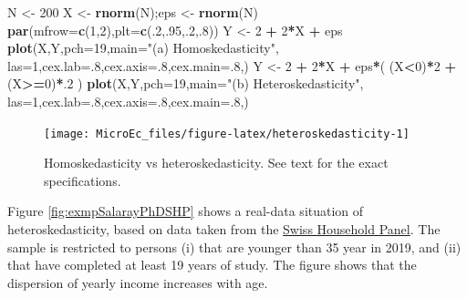\documentclass[
  12pt,
]{book}
\newenvironment{Shaded}{\begin{snugshade}}{\end{snugshade}}
\newcommand{\AttributeTok}[1]{\textcolor[rgb]{0.13,0.29,0.53}{#1}}
\newcommand{\DecValTok}[1]{\textcolor[rgb]{0.00,0.00,0.81}{#1}}
\newcommand{\FunctionTok}[1]{\textcolor[rgb]{0.13,0.29,0.53}{\textbf{#1}}}
\newcommand{\NormalTok}[1]{#1}
\newcommand{\OtherTok}[1]{\textcolor[rgb]{0.56,0.35,0.01}{#1}}
\newcommand{\SpecialCharTok}[1]{\textcolor[rgb]{0.81,0.36,0.00}{\textbf{#1}}}
\newcommand{\StringTok}[1]{\textcolor[rgb]{0.31,0.60,0.02}{#1}}
\theoremstyle{definition}
\theoremstyle{definition}
\theoremstyle{definition}
\theoremstyle{definition}
\theoremstyle{remark}
\begin{document}
\begin{Shaded}
\begin{Highlighting}[]
\NormalTok{N }\OtherTok{\textless{}{-}} \DecValTok{200}
\NormalTok{X }\OtherTok{\textless{}{-}} \FunctionTok{rnorm}\NormalTok{(N);eps }\OtherTok{\textless{}{-}} \FunctionTok{rnorm}\NormalTok{(N)}
\FunctionTok{par}\NormalTok{(}\AttributeTok{mfrow=}\FunctionTok{c}\NormalTok{(}\DecValTok{1}\NormalTok{,}\DecValTok{2}\NormalTok{),}\AttributeTok{plt=}\FunctionTok{c}\NormalTok{(.}\DecValTok{2}\NormalTok{,.}\DecValTok{95}\NormalTok{,.}\DecValTok{2}\NormalTok{,.}\DecValTok{8}\NormalTok{))}
\NormalTok{Y }\OtherTok{\textless{}{-}} \DecValTok{2} \SpecialCharTok{+} \DecValTok{2}\SpecialCharTok{*}\NormalTok{X }\SpecialCharTok{+}\NormalTok{ eps}
\FunctionTok{plot}\NormalTok{(X,Y,}\AttributeTok{pch=}\DecValTok{19}\NormalTok{,}\AttributeTok{main=}\StringTok{"(a) Homoskedasticity"}\NormalTok{,}
     \AttributeTok{las=}\DecValTok{1}\NormalTok{,}\AttributeTok{cex.lab=}\NormalTok{.}\DecValTok{8}\NormalTok{,}\AttributeTok{cex.axis=}\NormalTok{.}\DecValTok{8}\NormalTok{,}\AttributeTok{cex.main=}\NormalTok{.}\DecValTok{8}\NormalTok{,)}
\NormalTok{Y }\OtherTok{\textless{}{-}} \DecValTok{2} \SpecialCharTok{+} \DecValTok{2}\SpecialCharTok{*}\NormalTok{X }\SpecialCharTok{+}\NormalTok{ eps}\SpecialCharTok{*}\NormalTok{( (X}\SpecialCharTok{\textless{}}\DecValTok{0}\NormalTok{)}\SpecialCharTok{*}\DecValTok{2} \SpecialCharTok{+}\NormalTok{ (X}\SpecialCharTok{\textgreater{}=}\DecValTok{0}\NormalTok{)}\SpecialCharTok{*}\NormalTok{.}\DecValTok{2}\NormalTok{ )}
\FunctionTok{plot}\NormalTok{(X,Y,}\AttributeTok{pch=}\DecValTok{19}\NormalTok{,}\AttributeTok{main=}\StringTok{"(b) Heteroskedasticity"}\NormalTok{,}
     \AttributeTok{las=}\DecValTok{1}\NormalTok{,}\AttributeTok{cex.lab=}\NormalTok{.}\DecValTok{8}\NormalTok{,}\AttributeTok{cex.axis=}\NormalTok{.}\DecValTok{8}\NormalTok{,}\AttributeTok{cex.main=}\NormalTok{.}\DecValTok{8}\NormalTok{,)}
\end{Highlighting}
\end{Shaded}

\begin{figure}
\texttt{[image: MicroEc\_files/figure-latex/heteroskedasticity-1]} \caption{Homoskedasticity vs heteroskedasticity. See text for the exact specifications.}\label{fig:heteroskedasticity}
\end{figure}

Figure \ref{fig:exmpSalarayPhDSHP} shows a real-data situation of heteroskedasticity, based on data taken from the \href{https://forscenter.ch/projects/swiss-household-panel/}{Swiss Household Panel}. The sample is restricted to persons (i) that are younger than 35 year in 2019, and (ii) that have completed at least 19 years of study. The figure shows that the dispersion of yearly income increases with age.
\end{document}
